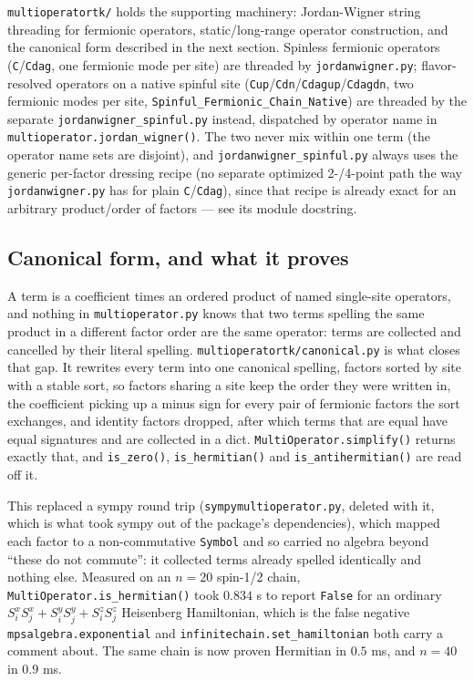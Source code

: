\documentclass[11pt]{article}
\begin{document}
\texttt{multioperatortk/} holds the supporting machinery: Jordan-Wigner
string threading for fermionic operators, static/long-range operator
construction, and the canonical form described in the next section.
Spinless fermionic
operators (\texttt{C}/\texttt{Cdag}, one fermionic mode per site) are
threaded by \texttt{jordanwigner.py}; flavor-resolved operators on a
native spinful site
(\texttt{Cup}/\texttt{Cdn}/\texttt{Cdagup}/\texttt{Cdagdn}, two
fermionic modes per site, \texttt{Spinful\_Fermionic\_Chain\_Native})
are threaded by the separate \texttt{jordanwigner\_spinful.py} instead,
dispatched by operator name in \texttt{multioperator.jordan\_wigner()}.
The two never mix within one term (the operator name sets are
disjoint), and \texttt{jordanwigner\_spinful.py} always uses the generic
per-factor dressing recipe (no separate optimized 2-/4-point path the
way \texttt{jordanwigner.py} has for plain \texttt{C}/\texttt{Cdag}),
since that recipe is already exact for an arbitrary product/order of
factors --- see its module docstring.

\subsection{Canonical form, and what it proves}
\label{sec:canonical}

A term is a coefficient times an ordered product of named single-site
operators, and nothing in \texttt{multioperator.py} knows that two terms
spelling the same product in a different factor order are the same
operator: terms are collected and cancelled by their literal spelling.
\texttt{multioperatortk/canonical.py} is what closes that gap. It
rewrites every term into one canonical spelling, factors sorted by site
with a stable sort, so factors sharing a site keep the order they were
written in, the coefficient picking up a minus sign for every pair of
fermionic factors the sort exchanges, and identity factors dropped,
after which terms that are equal have equal signatures and are collected
in a dict. \texttt{MultiOperator.simplify()} returns exactly that, and
\texttt{is\_zero()}, \texttt{is\_hermitian()} and
\texttt{is\_antihermitian()} are read off it.

This replaced a sympy round trip (\texttt{sympymultioperator.py},
deleted with it, which is what took sympy out of the package's
dependencies), which mapped each factor to a non-commutative
\texttt{Symbol} and so carried no algebra beyond
``these do not commute'': it collected terms already spelled identically
and nothing else. Measured on an $n=20$ spin-1/2 chain,
\texttt{MultiOperator.is\_hermitian()} took $0.834$ s to report
\texttt{False} for an ordinary $S^x_i S^x_j + S^y_i S^y_j + S^z_i S^z_j$
Heisenberg Hamiltonian, which is the false negative
\texttt{mpsalgebra.exponential} and
\texttt{infinitechain.set\_hamiltonian} both carry a comment about. The
same chain is now proven Hermitian in $0.5$ ms, and $n=40$ in $0.9$ ms.
\end{document}
